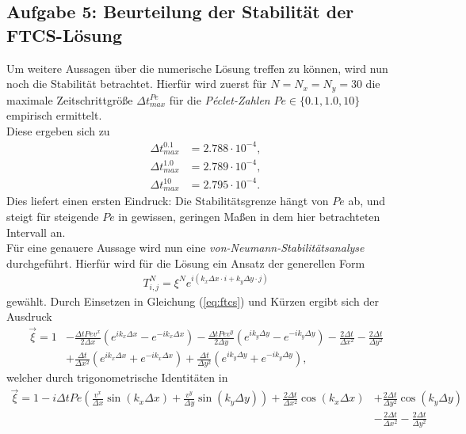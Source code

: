 \documentclass[12pt,a4paper,titlepage,headinclude,bibtotoc]{scrartcl}
\begin{document}
\hfill%



\subsection{Aufgabe 5: Beurteilung der Stabilität der FTCS-Lösung}
\label{sec:task5}
Um weitere Aussagen über die numerische Lösung treffen zu können, wird nun noch die Stabilität betrachtet. Hierfür wird zuerst für $N=N_x=N_y = 30$ die maximale Zeitschrittgröße $\Delta t^{Pe}_{max}$ für die \textit{Péclet-Zahlen} $Pe \in \{0.1, 1.0, 10\}$ empirisch ermittelt.\\
Diese ergeben sich zu
\begin{align*}
\Delta t^{0.1}_{max} &= 2.788 \cdot 10^{-4}, \\
\Delta t^{1.0}_{max} &= 2.789 \cdot 10^{-4}, \\
\Delta t^{10}_{max}  &= 2.795 \cdot 10^{-4} .
\end{align*}
Dies liefert einen ersten Eindruck: Die Stabilitätsgrenze hängt von $Pe$ ab, und steigt für steigende $Pe$ in gewissen, geringen Maßen in dem hier betrachteten Intervall an.\\
Für eine genauere Aussage wird nun eine \textit{von-Neumann-Stabilitätsanalyse} durchgeführt. Hierfür wird für die Lösung ein Ansatz der generellen Form
\begin{align*}
T^N_{i,j} = \xi^N e^{i(k_x \Delta x \cdot i + k_y \Delta y \cdot j)}
\end{align*}
gewählt.
Durch Einsetzen in Gleichung (\ref{eq:ftcs}) und Kürzen ergibt sich der Ausdruck
\begin{align*}
\vec{\xi} = 1 &- \frac{\Delta t Pe v^x}{2 \Delta x} \left( e^{i k_x \Delta x} - e^{-i k_x \Delta x} \right) - \frac{\Delta t Pe v^y}{2 \Delta y} \left( e^{i k_y \Delta y} - e^{-i k_y \Delta y} \right) -\frac{2 \Delta t}{\Delta x^2} - \frac{2 \Delta t}{\Delta y^2} \\
 &+ \frac{\Delta t}{\Delta x^2} \left( e^{i k_x \Delta x} + e^{-i k_x \Delta x} \right) +\frac{\Delta t}{\Delta y^2} \left( e^{i k_y \Delta y} + e^{-i k_y \Delta y} \right),
\end{align*}
welcher durch trigonometrische Identitäten in
\begin{align*}
\vec{\xi} = 1 - i \Delta t Pe\left(\frac{ v^x }{\Delta x} \sin(k_x \Delta x) + \frac{v^y}{\Delta y}  \sin(k_y \Delta y) \right) + \frac{2 \Delta t}{\Delta x^2}\cos(k_x \Delta x) &+ \frac{2 \Delta t}{\Delta y^2}\cos(k_y \Delta y) \\ &-\frac{2 \Delta t}{\Delta x^2} - \frac{2 \Delta t}{\Delta y^2}
\end{align*}
\end{document}
